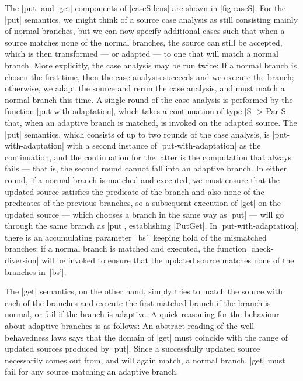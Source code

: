 \documentclass{sigplanconf}
\begin{document}
The |put| and |get| components of |caseS-lens| are shown in \autoref{fig:caseS}.
For the |put| semantics, we might think of a source case analysis as still consisting mainly of normal branches, but we can now specify additional cases such that when a source matches none of the normal branches, the source can still be accepted, which is then transformed --- or adapted --- to one that will match a normal branch.
More explicitly, the case analysis may be run twice: If a normal branch is chosen the first time, then the case analysis succeeds and we execute the branch; otherwise, we adapt the source and rerun the case analysis, and must match a normal branch this time.
A single round of the case analysis is performed by the function |put-with-adaptation|, which takes a continuation of type |S -> Par S| that, when an adaptive branch is matched, is invoked on the adapted source.
The |put| semantics, which consists of up to two rounds of the case analysis, is |put-with-adaptation| with a second instance of |put-with-adaptation| as the continuation, and the continuation for the latter is the computation that always fails --- that is, the second round cannot fall into an adaptive branch.
In either round, if a normal branch is matched and executed, we must ensure that the updated source satisfies the predicate of the branch and also none of the predicates of the previous branches, so a subsequent execution of |get| on the updated source --- which chooses a branch in the same way as |put| --- will go through the same branch as |put|, establishing |PutGet|.
In |put-with-adaptation|, there is an accumulating parameter~|bs'| keeping hold of the mismatched branches; if a normal branch is matched and executed, the function |check-diversion| will be invoked to ensure that the updated source matches none of the branches in~|bs'|.

The |get| semantics, on the other hand, simply tries to match the source with each of the branches and execute the first matched branch if the branch is normal, or fail if the branch is adaptive.
A quick reasoning for the behaviour about adaptive branches is as follows:
An abstract reading of the well-behavedness laws says that the domain of |get| must coincide with the range of updated sources produced by |put|.
Since a successfully updated source necessarily comes out from, and will again match, a normal branch, |get| must fail for any source matching an adaptive branch.
\end{document}
